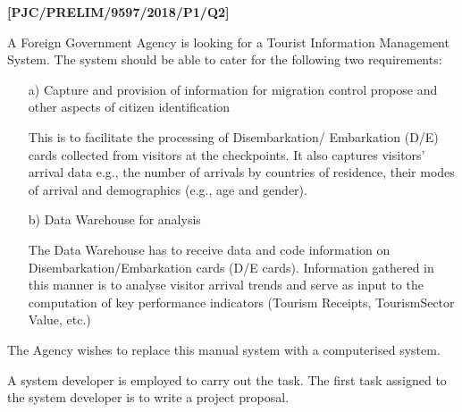 \item \textbf{{[}PJC/PRELIM/9597/2018/P1/Q2{]} }

\noindent A Foreign Government Agency is looking for a Tourist Information
Management System. The system should be able to cater for the following
two requirements: 
\begin{enumerate}
\item[a)]  Capture and provision of information for migration control propose
and other aspects of citizen identification 

This is to facilitate the processing of Disembarkation/ Embarkation
(D/E) cards collected from visitors at the checkpoints. It also captures
visitors\textquoteright{} arrival data e.g., the number of arrivals
by countries of residence, their modes of arrival and demographics
(e.g., age and gender). 
\item[b)]  Data Warehouse for analysis 

The Data Warehouse has to receive data and code information on Disembarkation/Embarkation
cards (D/E cards). Information gathered in this manner is to analyse
visitor arrival trends and serve as input to the computation of key
performance indicators (Tourism Receipts, TourismSector Value, etc.)
\end{enumerate}
The Agency wishes to replace this manual system with a computerised
system.

\noindent A system developer is employed to carry out the task. The
first task assigned to the system developer is to write a project
proposal.

